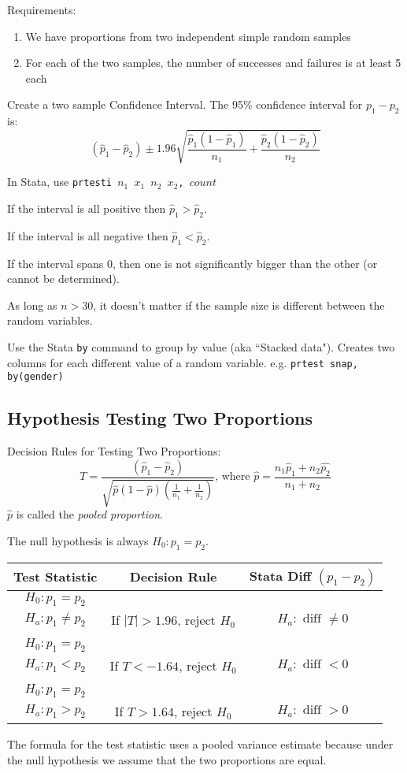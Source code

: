 \documentclass[11pt, oneside]{article}   	%
\begin{document}
Requirements:
\begin{enumerate}
\item{We have proportions from two independent simple random samples}
\item{For each of the two samples, the number of successes and failures is at least 5 each}
\end{enumerate}
Create a two sample Confidence Interval. The 95\% confidence interval for $p_1-p_2$ is:
\[
(\hat{p}_1 - \hat{p}_2) \pm 1.96 \sqrt{\frac{\hat{p}_1(1-\hat{p}_1)}{n_1} + \frac{\hat{p}_2(1-\hat{p}_2)}{n_2}   }
\]

In Stata, use \texttt{prtesti $n_1$ $x_1$ $n_2$ $x_2$, $count$}

If the interval is all positive then $\hat{p}_1 > \hat{p}_2$.

If the interval is all negative then $\hat{p}_1 < \hat{p}_2$.

If the interval spans 0, then one is not significantly bigger than the other (or cannot be determined). 

As long as $n > 30$, it doesn't matter if the sample size is different between the random variables.
 
 Use the Stata \texttt{by} command to group by value (aka ``Stacked data"). Creates two columns for each different value of a random variable. e.g. \texttt{prtest snap, by(gender)}

\subsection{Hypothesis Testing Two Proportions}

Decision Rules for Testing Two Proportions:
\[
T = \frac{(\hat{p}_1 - \hat{p}_2) }  { \sqrt{ \hat{p}(1-\hat{p}) (\frac{1}{n_1} + \frac{1}{n_2}) }} \text{, where } \hat{p} = \frac{n_1\hat{p}_1 + n_2\hat{p_2} } {n_1 + n_2 }
\]
$\hat{p}$ is called the \textit{pooled proportion}.

The null hypothesis is always $H_0 : p_1 = p_2$.

 \begin{tabular}{ c  c c }
Test Statistic & Decision Rule & Stata Diff $(p_1 - p_2)$ \\
\hline
$H_0 : p_1 = p_2$ \\      $H_a : p_1 \neq p_2$ & If $|T| > 1.96$, reject $H_0$ & $H_a: \text{ diff } \neq 0$\\
 & \\
$H_0 : p_1 = p_2$ \\ $H_a : p_1 < p_2$      & If $T < -1.64$, reject $H_0$ & $H_a: \text{ diff } < 0$\\
 & \\
$H_0 : p_1 = p_2$ \\ $H_a : p_1 > p_2$      & If $T > 1.64$, reject $H_0$ & $H_a: \text{ diff } > 0$\\
\end{tabular}
The formula for the test statistic uses a pooled variance estimate because under the null hypothesis we assume that the two proportions are equal.
\end{document}
